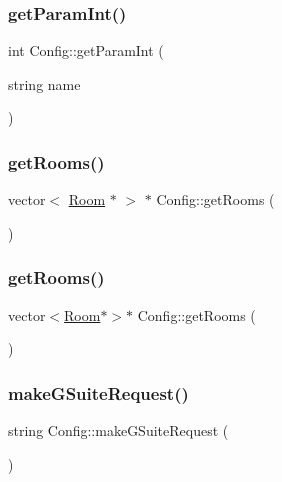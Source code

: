 \subsubsection{\texorpdfstring{get\+Param\+Int()}{getParamInt()}\hspace{0.1cm}{\footnotesize\ttfamily [2/2]}}
{\footnotesize\ttfamily int Config\+::get\+Param\+Int (\begin{DoxyParamCaption}\item[{string}]{name }\end{DoxyParamCaption})}

\mbox{\label{class_config_a644ff01239e20fabb038a2b2eddf1a26}} 
\subsubsection{\texorpdfstring{get\+Rooms()}{getRooms()}\hspace{0.1cm}{\footnotesize\ttfamily [1/2]}}
{\footnotesize\ttfamily vector$<$ \hyperlink{class_room}{Room} $\ast$ $>$ $\ast$ Config\+::get\+Rooms (\begin{DoxyParamCaption}{ }\end{DoxyParamCaption})}

\mbox{\label{class_config_ab10c3b7d3a76fcfa411ecba1dddc9716}} 
\subsubsection{\texorpdfstring{get\+Rooms()}{getRooms()}\hspace{0.1cm}{\footnotesize\ttfamily [2/2]}}
{\footnotesize\ttfamily vector$<$\hyperlink{class_room}{Room}$\ast$$>$$\ast$ Config\+::get\+Rooms (\begin{DoxyParamCaption}{ }\end{DoxyParamCaption})}

\mbox{\label{class_config_a45dfcb0ab6def40b1ee15a0521a717ac}} 
\subsubsection{\texorpdfstring{make\+G\+Suite\+Request()}{makeGSuiteRequest()}\hspace{0.1cm}{\footnotesize\ttfamily [1/2]}}
{\footnotesize\ttfamily string Config\+::make\+G\+Suite\+Request (\begin{DoxyParamCaption}{ }\end{DoxyParamCaption})\hspace{0.3cm}{\ttfamily [private]}}

